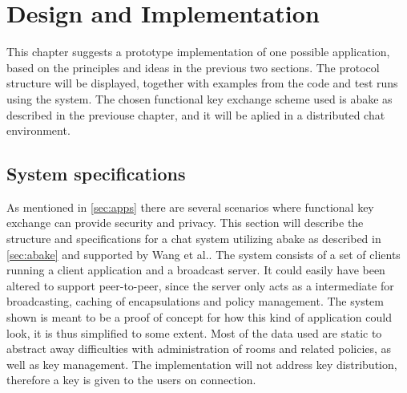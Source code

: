 \chapter{Design and Implementation}\label{chp:designimpl}
This chapter suggests a prototype implementation of one possible application, based on the principles and ideas in the previous two sections. The protocol structure will be displayed, together with examples from the code and test runs using the system. The chosen functional key exchange scheme used is \gls{abake} as described in the previouse chapter, and it will be aplied in a distributed chat environment. 

\section{System specifications}\label{sec:chat}
As mentioned in \ref{sec:apps} there are several scenarios where functional key exchange can provide security and privacy. This section will describe the structure and specifications for a chat system utilizing \gls{abake} as described in \ref{sec:abake} and  supported by Wang et al.\cite{DBLP:abake}. The system consists of a set of clients running a client application and a broadcast server. It could easily have been altered to support peer-to-peer, since the server only acts as a intermediate for broadcasting, caching of encapsulations and policy management. The system shown is meant to be a proof of concept for how this kind of application could look, it is thus simplified to some extent. Most of the data used are static to abstract away difficulties with administration of rooms and related policies, as well as key management. The implementation will not address key distribution, therefore a key is given to the users on connection. 



